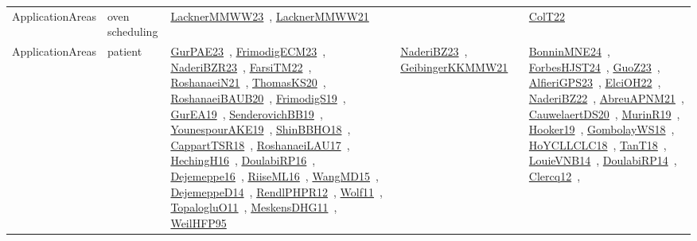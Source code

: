 {\begin{longtable}{lp{3cm}>{\raggedright\arraybackslash}p{6cm}>{\raggedright\arraybackslash}p{6cm}>{\raggedright\arraybackslash}p{8cm}}
\index{oven scheduling}\index{ApplicationAreas!oven scheduling}ApplicationAreas & oven scheduling & \href{../works/LacknerMMWW23.pdf}{LacknerMMWW23}~\cite{LacknerMMWW23}, \href{../works/LacknerMMWW21.pdf}{LacknerMMWW21}~\cite{LacknerMMWW21} &  & \href{../works/ColT22.pdf}{ColT22}~\cite{ColT22}\\
\index{patient}\index{ApplicationAreas!patient}ApplicationAreas & patient & \href{../works/GurPAE23.pdf}{GurPAE23}~\cite{GurPAE23}, \href{../works/FrimodigECM23.pdf}{FrimodigECM23}~\cite{FrimodigECM23}, \href{../works/NaderiBZR23.pdf}{NaderiBZR23}~\cite{NaderiBZR23}, \href{../works/FarsiTM22.pdf}{FarsiTM22}~\cite{FarsiTM22}, \href{../works/RoshanaeiN21.pdf}{RoshanaeiN21}~\cite{RoshanaeiN21}, \href{../works/ThomasKS20.pdf}{ThomasKS20}~\cite{ThomasKS20}, \href{../works/RoshanaeiBAUB20.pdf}{RoshanaeiBAUB20}~\cite{RoshanaeiBAUB20}, \href{../works/FrimodigS19.pdf}{FrimodigS19}~\cite{FrimodigS19}, \href{../works/GurEA19.pdf}{GurEA19}~\cite{GurEA19}, \href{../works/SenderovichBB19.pdf}{SenderovichBB19}~\cite{SenderovichBB19}, \href{../works/YounespourAKE19.pdf}{YounespourAKE19}~\cite{YounespourAKE19}, \href{../works/ShinBBHO18.pdf}{ShinBBHO18}~\cite{ShinBBHO18}, \href{../works/CappartTSR18.pdf}{CappartTSR18}~\cite{CappartTSR18}, \href{../works/RoshanaeiLAU17.pdf}{RoshanaeiLAU17}~\cite{RoshanaeiLAU17}, \href{../works/HechingH16.pdf}{HechingH16}~\cite{HechingH16}, \href{../works/DoulabiRP16.pdf}{DoulabiRP16}~\cite{DoulabiRP16}, \href{../works/Dejemeppe16.pdf}{Dejemeppe16}~\cite{Dejemeppe16}, \href{../works/RiiseML16.pdf}{RiiseML16}~\cite{RiiseML16}, \href{../works/WangMD15.pdf}{WangMD15}~\cite{WangMD15}, \href{../works/DejemeppeD14.pdf}{DejemeppeD14}~\cite{DejemeppeD14}, \href{../works/RendlPHPR12.pdf}{RendlPHPR12}~\cite{RendlPHPR12}, \href{../works/Wolf11.pdf}{Wolf11}~\cite{Wolf11}, \href{../works/TopalogluO11.pdf}{TopalogluO11}~\cite{TopalogluO11}, \href{../works/MeskensDHG11.pdf}{MeskensDHG11}~\cite{MeskensDHG11}, \href{../works/WeilHFP95.pdf}{WeilHFP95}~\cite{WeilHFP95} & \href{../works/NaderiBZ23.pdf}{NaderiBZ23}~\cite{NaderiBZ23}, \href{../works/GeibingerKKMMW21.pdf}{GeibingerKKMMW21}~\cite{GeibingerKKMMW21} & \href{../works/BonninMNE24.pdf}{BonninMNE24}~\cite{BonninMNE24}, \href{../works/ForbesHJST24.pdf}{ForbesHJST24}~\cite{ForbesHJST24}, \href{../works/GuoZ23.pdf}{GuoZ23}~\cite{GuoZ23}, \href{../works/AlfieriGPS23.pdf}{AlfieriGPS23}~\cite{AlfieriGPS23}, \href{../works/ElciOH22.pdf}{ElciOH22}~\cite{ElciOH22}, \href{../works/NaderiBZ22.pdf}{NaderiBZ22}~\cite{NaderiBZ22}, \href{../works/AbreuAPNM21.pdf}{AbreuAPNM21}~\cite{AbreuAPNM21}, \href{../works/CauwelaertDS20.pdf}{CauwelaertDS20}~\cite{CauwelaertDS20}, \href{../works/MurinR19.pdf}{MurinR19}~\cite{MurinR19}, \href{../works/Hooker19.pdf}{Hooker19}~\cite{Hooker19}, \href{../works/GombolayWS18.pdf}{GombolayWS18}~\cite{GombolayWS18}, \href{../works/HoYCLLCLC18.pdf}{HoYCLLCLC18}~\cite{HoYCLLCLC18}, \href{../works/TanT18.pdf}{TanT18}~\cite{TanT18}, \href{../works/LouieVNB14.pdf}{LouieVNB14}~\cite{LouieVNB14}, \href{../works/DoulabiRP14.pdf}{DoulabiRP14}~\cite{DoulabiRP14}, \href{../works/Clercq12.pdf}{Clercq12}~\cite{Clercq12}, 
\end{longtable}}

